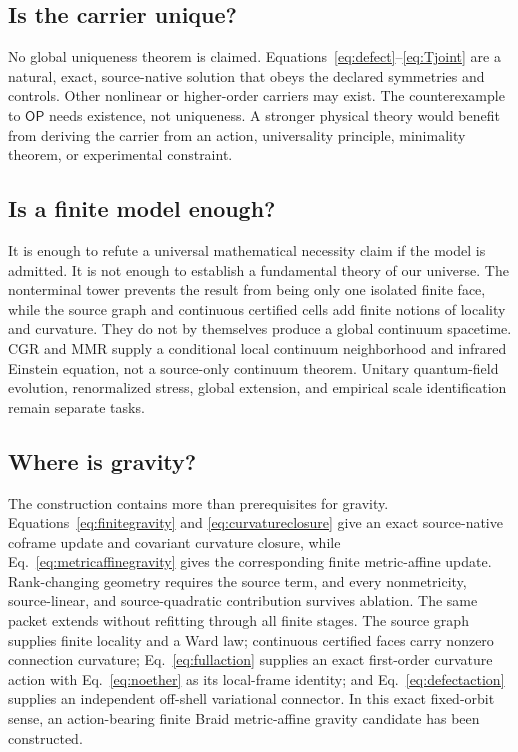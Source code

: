 \documentclass[11pt]{article}
\theoremstyle{definition}
\theoremstyle{remark}
\newcommand{\OPT}{\mathsf{OP}}
\begin{document}
\subsection{Is the carrier unique?}

No global uniqueness theorem is claimed. Equations~\eqref{eq:defect}--\eqref{eq:Tjoint} are a natural, exact, source-native solution that obeys the declared symmetries and controls. Other nonlinear or higher-order carriers may exist. The counterexample to $\OPT$ needs existence, not uniqueness. A stronger physical theory would benefit from deriving the carrier from an action, universality principle, minimality theorem, or experimental constraint.

\subsection{Is a finite model enough?}

It is enough to refute a universal mathematical necessity claim if the model is admitted. It is not enough to establish a fundamental theory of our universe. The nonterminal tower prevents the result from being only one isolated finite face, while the source graph and continuous certified cells add finite notions of locality and curvature. They do not by themselves produce a global continuum spacetime. CGR and MMR supply a conditional local continuum neighborhood and infrared Einstein equation, not a source-only continuum theorem. Unitary quantum-field evolution, renormalized stress, global extension, and empirical scale identification remain separate tasks.

\subsection{Where is gravity?}

The construction contains more than prerequisites for gravity. Equations~\eqref{eq:finitegravity} and \eqref{eq:curvatureclosure} give an exact source-native coframe update and covariant curvature closure, while Eq.~\eqref{eq:metricaffinegravity} gives the corresponding finite metric-affine update. Rank-changing geometry requires the source term, and every nonmetricity, source-linear, and source-quadratic contribution survives ablation. The same packet extends without refitting through all finite stages. The source graph supplies finite locality and a Ward law; continuous certified faces carry nonzero connection curvature; Eq.~\eqref{eq:fullaction} supplies an exact first-order curvature action with Eq.~\eqref{eq:noether} as its local-frame identity; and Eq.~\eqref{eq:defectaction} supplies an independent off-shell variational connector. In this exact fixed-orbit sense, an action-bearing finite Braid metric-affine gravity candidate has been constructed.
\end{document}
